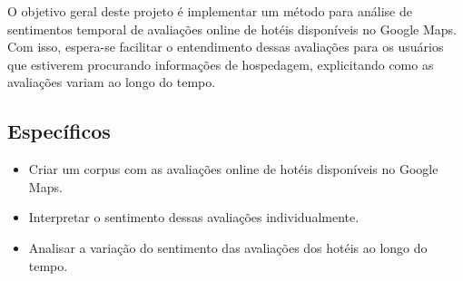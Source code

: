O objetivo geral deste projeto é implementar um método para análise de sentimentos temporal de avaliações online de hotéis disponíveis no Google Maps. Com isso, espera-se facilitar o entendimento dessas avaliações para os usuários que estiverem procurando informações de hospedagem, explicitando como as avaliações variam ao longo do tempo.

\subsection{Específicos}

\begin{itemize}
    \item Criar um corpus com as avaliações online de hotéis disponíveis no Google Maps.
    \item Interpretar o sentimento dessas avaliações individualmente.
    \item Analisar a variação do sentimento das avaliações dos hotéis ao longo do tempo.
\end{itemize}
